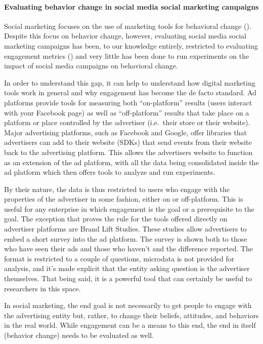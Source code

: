 \documentclass[a4paper,12pt]{article}
\begin{document}
\paragraph{Evaluating behavior change in social media social marketing campaigns}

Social marketing focuses on the use of marketing tools for behavioral change (\cite{Andreasen1994}). Despite this focus on behavior change, however, evaluating social media social marketing campaigns has been, to our knowledge entirely, restricted to evaluating engagement metrics (\cite{Shawky2019}) and very little has been done to run experiments on the impact of social media campaigns on behavioral change.

In order to understand this gap, it can help to understand how digital marketing tools work in general and why engagement has become the de facto standard. Ad platforms provide tools for measuring both ``on-platform'' results (users interact with your Facebook page) as well as ``off-platform'' results that take place on a platform or place controlled by the advertiser (i.e.\ their store or their website). Major advertising platforms, such as Facebook and Google, offer libraries that advertisers can add to their website (SDKs) that send events from their website back to the advertising platform. This allows the advertisers website to function as an extension of the ad platform, with all the data being consolidated inside the ad platform which then offers tools to analyze and run experiments.

By their nature, the data is thus restricted to users who engage with the properties of the advertiser in some fashion, either on or off-platform. This is useful for any enterprise in which engagement is the goal or a prerequisite to the goal. The exception that proves the rule for the tools offered directly on advertiser platforms are Brand Lift Studies. These studies allow advertisers to embed a short survey into the ad platform. The survey is shown both to those who have seen their ads and those who haven't and the difference reported. The format is restricted to a couple of questions, microdata is not provided for analysis, and it's made explicit that the entity asking question is the advertiser themselves. That being said, it is a powerful tool that can certainly be useful to researchers in this space.

In social marketing, the end goal is not necessarily to get people to engage with the advertising entity but, rather, to change their beliefs, attitudes, and behaviors in the real world. While engagement can be a means to this end, the end in itself (behavior change) needs to be evaluated as well.
\end{document}
